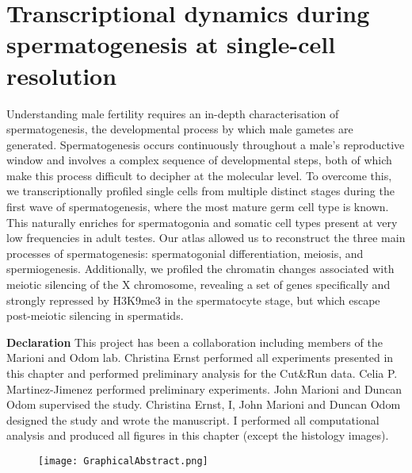 
\chapter{Transcriptional dynamics during spermatogenesis at single-cell resolution}  

\graphicspath{{Chapter3/Figures/}}

\begin{Abstract}
Understanding male fertility requires an in-depth characterisation of spermatogenesis, the developmental process by which male gametes are generated. Spermatogenesis occurs continuously throughout a male’s reproductive window and involves a complex sequence of developmental steps, both of which make this process difficult to decipher at the molecular level. To overcome this, we transcriptionally profiled single cells from multiple distinct stages during the first wave of spermatogenesis, where the most mature germ cell type is known. This naturally enriches for spermatogonia and somatic cell types present at very low frequencies in adult testes. Our atlas allowed us to reconstruct the three main processes of spermatogenesis: spermatogonial differentiation, meiosis, and spermiogenesis. Additionally, we profiled the chromatin changes associated with meiotic silencing of the X chromosome, revealing a set of genes specifically and strongly repressed by H3K9me3 in the spermatocyte stage, but which escape post-meiotic silencing in spermatids.
\end{Abstract}

\newpage

\begin{Comment}
\textbf{Declaration} This project has been a collaboration including members of the Marioni and Odom lab. Christina Ernst performed all experiments presented in this chapter and performed preliminary analysis for the Cut\&Run data. Celia P. Martinez-Jimenez performed preliminary experiments. John Marioni and Duncan Odom supervised the study. Christina Ernst, I, John Marioni and Duncan Odom designed the study and wrote the manuscript. I performed all computational analysis and produced all figures in this chapter (except the histology images).
\end{Comment}

\begin{figure}[hb]
\centering    
\texttt{[image: GraphicalAbstract.png]}
\caption*{}
\end{figure}


\newpage


\newpage



